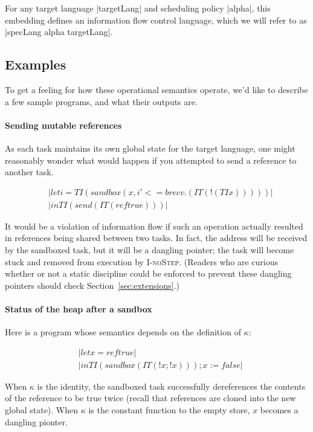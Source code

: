 For any target language |targetLang| and scheduling policy |alpha|, this
embedding defines an information flow control language, which we will
refer to as |specLang alpha targetLang|.

\subsection{Examples}

To get a feeling for how these operational semantics operate, we'd like to
describe a few sample programs, and what their outputs are.

\paragraph{Sending mutable references}  As each task maintains its own
global state for the target language, one might reasonably wonder what would
happen if you attempted to send a reference to another task.

\begin{align*}
    & |let i = TI (sandbox (x, i' <= brecv . (IT (!(TI x)))))| \\
    & |in TI (send (IT (ref true)))|
\end{align*}

It would be a violation of information flow if such an operation actually
resulted in references being shared between two tasks.  In fact, the address
will be received by the sandboxed task, but it will be a dangling pointer; the
task will become stuck and removed from execution by \textsc{I-noStep}.  (Readers
who are curious whether or not a static discipline could be enforced to
prevent these dangling pointers should check Section~\ref{sec:extensions}.)

\paragraph{Status of the heap after a sandbox}  Here is a program whose
semantics depends on the definition of $\kappa$:

\begin{align*}
    & |let x = ref true| \\
    & |in TI (sandbox (IT (!x; !x))); x := false|
\end{align*}

When $\kappa$ is the identity, the sandboxed task successfully dereferences
the contents of the reference to be true twice (recall that references
are cloned into the new global state).  When $\kappa$ is the constant function
to the empty store, $x$ becomes a dangling pionter.

